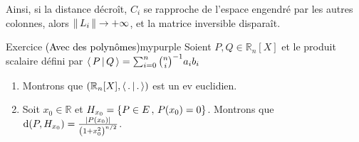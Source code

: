         Ainsi, si la distance décroît,  $C_i$ se rapproche de l’espace engendré par les autres colonnes, alors $\left\lVert\,L_i\,\right\rVert \to +\infty$, et la matrice inversible disparaît.

        \begin{omed}{Exercice \textcolor{black}{(Avec des polynômes)}}{mypurple}
            Soient $P,Q \in \mathbb{R}_n[X]$ et le produit scalaire défini par 
            $\left<\,P\,\middle|\,Q\,\right> = \sum_{i=0}^{n} \binom{n}{i}^{-1} a_i b_i$ 
            \begin{enumerate}
                \item Montrons que $(\mathbb{R}_n[X], \left<\,.\,\middle|\,.\,\right>)$ est un ev euclidien.
                \item Soit $x_0 \in \mathbb{R}$ et $H_{x_0} = \left\{ P \in E \, , \, P(x_0) = 0 \right\}$. Montrons que $\operatorname{d}(P,H_{x_0}) = \frac{\left\lvert P(x_0)\right\rvert}{\left(1 + x_0^2\right)^{n/2}}$.
            \end{enumerate}
        \end{omed}

